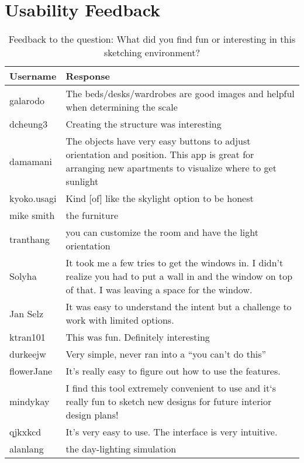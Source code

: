 \section{Usability Feedback}

\begin{table}[h]
\centering
\begin{tabular}{|p{}|p{}|}
\hline
\rowcolor[HTML]{EFEFEF} 
{\color[HTML]{000000} \textbf{Username}} & {\color[HTML]{000000} \textbf{Response}} \\ \hline
galarodo & The beds/desks/wardrobes are good images and helpful when determining the scale \\ \hline
dcheung3 & Creating the structure was interesting \\ \hline
damamani & The objects have very easy buttons to adjust orientation and position. This app is great for arranging new apartments to visualize where to get sunlight \\ \hline
kyoko.usagi & Kind {[}of{]} like the skylight option to be honest \\ \hline
mike smith & the furniture \\ \hline
tranthang & you can customize the room and have the light orientation \\ \hline
Solyha & It took me a few tries to get the windows in. I didn't realize you had to put a wall in and the window on top of that. I was leaving a space for the window. \\ \hline
Jan Selz & It was easy to understand the intent but a challenge to work with limited options. \\ \hline
ktran101 & This was fun. Definitely interesting \\ \hline
durkeejw & Very simple, never ran into a ``you can't do this'' \\ \hline
flowerJane & It's really easy to figure out how to use the features. \\ \hline
mindykay & I find this tool extremely convenient to use and it`s really fun to sketch new designs for future interior design plans! \\ \hline
qjkxkcd & It's very easy to use. The interface is very intuitive. \\ \hline
alanlang & the day-lighting simulation \\ \hline
\end{tabular}
\caption{Feedback to the question: What did you find fun or interesting in this sketching environment?}
\label{fig:fun}
\end{table}

